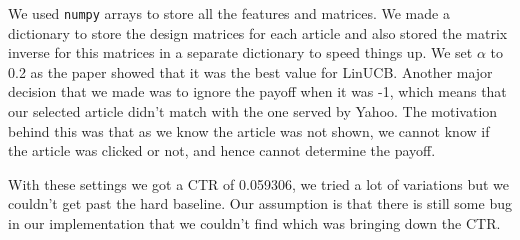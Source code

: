 \documentclass[a4paper, 11pt]{article}
\begin{document}
We used \lstinline{numpy} arrays to store all the features and matrices. We made a dictionary to store the design matrices for each article and also stored
the matrix inverse for this matrices in a separate dictionary to speed things up. We set $\alpha$ to 0.2 as the paper showed that it was the best value for LinUCB.
Another major decision that we made was to ignore the payoff when it was -1, which means that our selected article didn't match with the one served by
Yahoo. The motivation behind this was that as we know the article was not shown, we cannot know if the article was clicked or not, and hence cannot determine
the payoff.

With these settings we got a CTR of 0.059306, we tried a lot of variations but we couldn't get past the hard baseline. Our assumption is that there is still
some bug in our implementation that we couldn't find which was bringing down the CTR.
\end{document}
